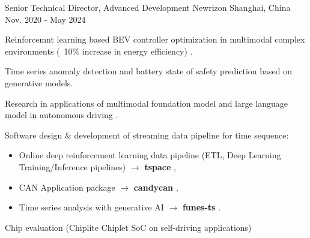 \documentclass[../cv.tex]{subfiles}
\begin{document}


\begin{cventries}

  \cventry
    {Senior Technical Director, Advanced Development} %
    {Newrizon} %
    {Shanghai, China} %
    {Nov. 2020 - May 2024} %
    {
      \begin{cvitems} %
          \item Reinforcemnt learning based BEV controller optimization in multimodal complex environments (~10\% increase in energy efficiency)
          \supercite{Xin_VEOS_22} \supercite{Xin_Fu_Pan_Simulation_Test_RL_22} \supercite{Pan_Xin_DrvStyle_23}.
          \item Time series anomaly detection and battery state of safety prediction based on generative models. \supercite{Xin_GenAI_23} \supercite{Xin_Chen_NN_TSFeatures_23}
          \item Research in applications of multimodal foundation model and large language model in autonomous driving \supercite{Xin_LLM_24} \supercite{Xin_VLM_24} \supercite{Xin_Latent_Diffusion_23}.
          \item Software design \& development of streaming data pipeline for time sequence:
            \begin{itemize}
                    \item Online deep reinforcement learning data pipeline (ETL, Deep Learning Training/Inference pipelines) $\rightarrow$ \textbf{tspace} \href{https://binjian.github.io/tspace/}{\faGithub},
                    \item CAN Application package $\rightarrow$ \textbf{candycan} \href{https://binjian.github.io/candycan/}{\faGithub},
                    \item Time series analysis with generative AI $\rightarrow$ \textbf{funes-ts} \href{https://github.com/binjian/funes-ts/}{\faGithub}.
            \end{itemize}
          \item Chip evaluation (Chiplite Chiplet SoC on self-driving applications)
      \end{cvitems}
    }


\end{cventries}
\end{document}
